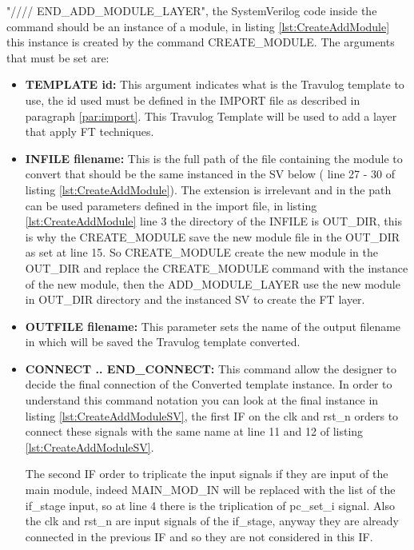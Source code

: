 {{{           "//// END\_ADD\_MODULE\_LAYER", the SystemVerilog code inside the command should be an instance of a module, in listing \ref{lst:CreateAddModule} this instance is created by the command CREATE\_MODULE.
           The arguments that must be set are:
            \begin{itemize}
                \item \textbf{TEMPLATE id:} This argument indicates what is the Travulog template to use, the id used must be defined in the IMPORT file as described in paragraph \ref{par:import}. This Travulog Template will be used to add a layer that apply FT techniques.
                \item \textbf{INFILE filename:} This is the full path of the file containing the module to convert that should be the same instanced in the SV below ( line 27 - 30 of listing \ref{lst:CreateAddModule}). The extension is irrelevant and in the path can be used parameters defined in the import file, in listing  \ref{lst:CreateAddModule} line 3 the directory of the INFILE is OUT\_DIR, this is why the CREATE\_MODULE save the new module file in the OUT\_DIR as set at line 15. 
                So CREATE\_MODULE create the new module in the OUT\_DIR and replace the CREATE\_MODULE command with the instance of the new module, then the ADD\_MODULE\_LAYER use the new module in OUT\_DIR directory and the instanced SV to create the FT layer.
                \item \textbf{OUTFILE filename:} This parameter sets the name of the output filename in which will be saved the Travulog template converted.
                \item \textbf{CONNECT .. END\_CONNECT:} This command allow the designer to decide the final connection of the Converted template instance. In order to understand this command notation you can look at the final instance in listing \ref{lst:CreateAddModuleSV}, the first IF on the clk and rst\_n  orders to connect these signals with the same name at line 11 and 12 of listing \ref{lst:CreateAddModuleSV}.
                
                The second IF order to triplicate the input signals if they are input of the main module, indeed MAIN\_MOD\_IN will be replaced with the list of the if\_stage input, so at line 4 there is the triplication of pc\_set\_i signal. Also the clk and rst\_n are input signals of the if\_stage, anyway they are already connected in the previous IF and so they are not considered in this IF.
                

\end{itemize}}}}
